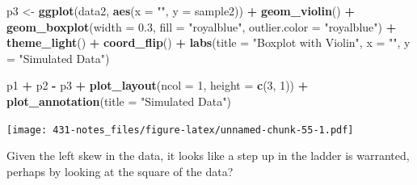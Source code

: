 \documentclass[
]{book}
\newenvironment{Shaded}{\begin{snugshade}}{\end{snugshade}}
\newcommand{\DataTypeTok}[1]{\textcolor[rgb]{0.13,0.29,0.53}{#1}}
\newcommand{\DecValTok}[1]{\textcolor[rgb]{0.00,0.00,0.81}{#1}}
\newcommand{\FloatTok}[1]{\textcolor[rgb]{0.00,0.00,0.81}{#1}}
\newcommand{\KeywordTok}[1]{\textcolor[rgb]{0.13,0.29,0.53}{\textbf{#1}}}
\newcommand{\NormalTok}[1]{#1}
\newcommand{\OperatorTok}[1]{\textcolor[rgb]{0.81,0.36,0.00}{\textbf{#1}}}
\newcommand{\StringTok}[1]{\textcolor[rgb]{0.31,0.60,0.02}{#1}}
\begin{document}
\begin{Shaded}
\begin{Highlighting}[]
\NormalTok{p3 <-}\StringTok{ }\KeywordTok{ggplot}\NormalTok{(data2, }\KeywordTok{aes}\NormalTok{(}\DataTypeTok{x =} \StringTok{""}\NormalTok{, }\DataTypeTok{y =}\NormalTok{ sample2)) }\OperatorTok{+}
\StringTok{    }\KeywordTok{geom_violin}\NormalTok{() }\OperatorTok{+}
\StringTok{    }\KeywordTok{geom_boxplot}\NormalTok{(}\DataTypeTok{width =} \FloatTok{0.3}\NormalTok{, }\DataTypeTok{fill =} \StringTok{"royalblue"}\NormalTok{, }
                 \DataTypeTok{outlier.color =} \StringTok{"royalblue"}\NormalTok{) }\OperatorTok{+}
\StringTok{    }\KeywordTok{theme_light}\NormalTok{() }\OperatorTok{+}
\StringTok{    }\KeywordTok{coord_flip}\NormalTok{() }\OperatorTok{+}
\StringTok{    }\KeywordTok{labs}\NormalTok{(}\DataTypeTok{title =} \StringTok{"Boxplot with Violin"}\NormalTok{,}
         \DataTypeTok{x =} \StringTok{""}\NormalTok{, }\DataTypeTok{y =} \StringTok{"Simulated Data"}\NormalTok{)}

\NormalTok{p1 }\OperatorTok{+}\StringTok{ }\NormalTok{p2 }\OperatorTok{-}\StringTok{ }\NormalTok{p3 }\OperatorTok{+}\StringTok{ }\KeywordTok{plot_layout}\NormalTok{(}\DataTypeTok{ncol =} \DecValTok{1}\NormalTok{, }\DataTypeTok{height =} \KeywordTok{c}\NormalTok{(}\DecValTok{3}\NormalTok{, }\DecValTok{1}\NormalTok{)) }\OperatorTok{+}
\StringTok{    }\KeywordTok{plot_annotation}\NormalTok{(}\DataTypeTok{title =} \StringTok{"Simulated Data"}\NormalTok{)}
\end{Highlighting}
\end{Shaded}

\texttt{[image: 431-notes\_files/figure-latex/unnamed-chunk-55-1.pdf]}

Given the left skew in the data, it looks like a step up in the ladder is warranted, perhaps by looking at the square of the data?
\end{document}
